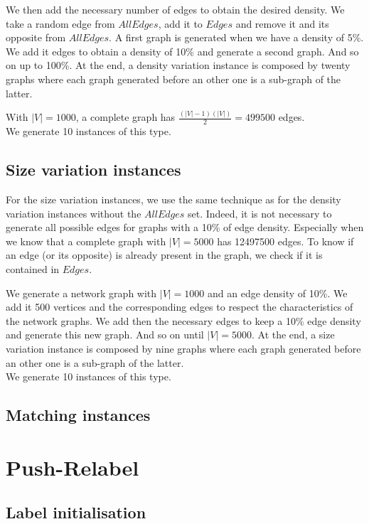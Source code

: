 We then add the necessary number of edges to obtain the desired density. We take a random edge from $AllEdges$, add it to $Edges$ and remove it and its opposite from $AllEdges$. A first graph is generated when we have a density of 5\%. We add it edges to obtain a density of 10\% and generate a second graph. And so on up to 100\%. At the end, a density variation instance is composed by twenty graphs where each graph generated before an other one is a sub-graph of the latter.

With $|V|=1000$, a complete graph has $\frac{(|V|-1)(|V|)}{2} = 499500$ edges.\\

We generate 10 instances of this type.

\subsection{Size variation instances}
For the size variation instances, we use the same technique as for the density variation instances without the $AllEdges$ set. Indeed, it is not necessary to generate all possible edges for graphs with a 10\% of edge density. Especially when we know that a complete graph with $|V|=5000$ has 12497500 edges. To know if an edge (or its opposite) is already present in the graph, we check if it is contained in $Edges$.

We generate a network graph with $|V|=1000$ and an edge density of 10\%. We add it 500 vertices and the corresponding edges to respect the characteristics of the network graphs. We add then the necessary edges to keep a 10\% edge density and generate this new graph. And so on until $|V|=5000$. At the end, a size variation instance is composed by nine graphs where each graph generated before an other one is a sub-graph of the latter. \\

We generate 10 instances of this type.

\subsection{Matching instances}

\section{Push-Relabel}
\subsection{Label initialisation}
